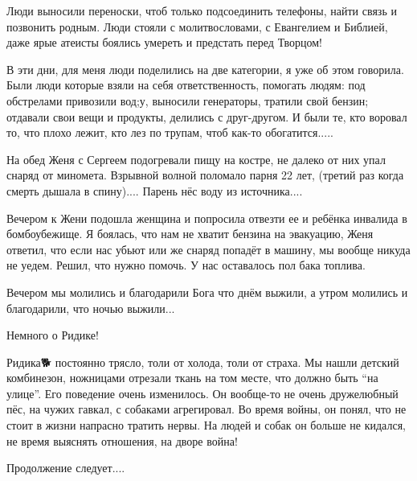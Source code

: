 Люди выносили переноски, чтоб только подсоединить телефоны, найти связь и
позвонить родным. Люди стояли с молитвословами, с Евангелием и Библией, даже
ярые атеисты боялись умереть и предстать перед Творцом! 

В эти дни, для меня люди поделились на две категории, я уже об этом говорила.
Были люди которые взяли на себя ответственность, помогать людям: под обстрелами
привозили вод;у, выносили генераторы, тратили свой бензин; отдавали свои вещи и
продукты, делились с друг-другом. И были те, кто воровал то, что плохо лежит,
кто лез по трупам, чтоб как-то обогатится.....

На обед Женя с Сергеем подогревали пищу на костре, не далеко от них упал снаряд
от миномета. Взрывной волной поломало парня 22 лет, (третий раз когда смерть
дышала в спину).... Парень нёс воду из источника....

Вечером к Жени подошла женщина и попросила отвезти ее и ребёнка инвалида в
бомбоубежище. Я боялась, что нам не хватит бензина на эвакуацию, Женя ответил,
что если нас убьют или же снаряд попадёт в машину, мы вообще никуда не уедем.
Решил, что нужно помочь. У нас оставалось пол бака топлива. 

Вечером мы молились и благодарили Бога что днём выжили, а утром молились и
благодарили, что ночью выжили...

Немного о Ридике!

Ридика🐕 постоянно трясло, толи от холода, толи от страха. Мы нашли детский
комбинезон, ножницами отрезали ткань на том месте, что должно быть \enquote{на улице}.
Его поведение очень изменилось. Он вообще-то не очень дружелюбный пёс, на чужих
гавкал, с собаками агрегировал. Во время войны, он понял, что не стоит в жизни
напрасно тратить нервы. На людей и собак он больше не кидался, не время
выяснять отношения, на дворе война!

Продолжение следует....

